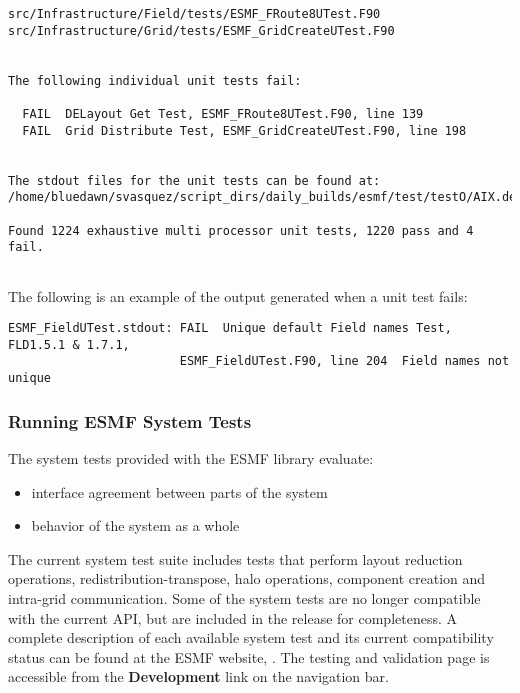 \begin{verbatim}
src/Infrastructure/Field/tests/ESMF_FRoute8UTest.F90
src/Infrastructure/Grid/tests/ESMF_GridCreateUTest.F90


The following individual unit tests fail:

  FAIL  DELayout Get Test, ESMF_FRoute8UTest.F90, line 139                                                                                                                                                                                                       
  FAIL  Grid Distribute Test, ESMF_GridCreateUTest.F90, line 198                                                                                                                                                                                                 


The stdout files for the unit tests can be found at:
/home/bluedawn/svasquez/script_dirs/daily_builds/esmf/test/testO/AIX.default.64.default

Found 1224 exhaustive multi processor unit tests, 1220 pass and 4 fail.


\end{verbatim}

The following is an example of the output generated when a unit test fails:
\begin{verbatim}
ESMF_FieldUTest.stdout: FAIL  Unique default Field names Test, FLD1.5.1 & 1.7.1,
                        ESMF_FieldUTest.F90, line 204  Field names not unique
\end{verbatim}

\subsubsection{Running ESMF System Tests}
\label{SystemTestDescription}

The system tests provided with the ESMF library evaluate:
\begin{itemize}
\item interface agreement between parts of the system
\item behavior of the system as a whole
\end{itemize}

The current system test suite includes tests that perform layout
reduction operations, redistribution-transpose, halo operations,
component creation and intra-grid communication.  Some of the system
tests are no longer compatible with the current API, but are included
in the release for completeness.  A complete description of each
available system test and its current compatibility status can be
found at the ESMF website,
.  
The testing
and validation page is accessible from the {\bf Development} 
link on the navigation bar.

